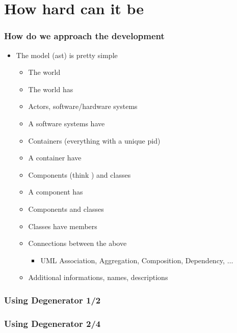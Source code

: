 \documentclass[xelatex,10pt]{beamer}
\begin{document}
\section{How hard can it be}
\begin{frame}
	\frametitle{How do we approach the development}
	\begin{itemize}
		\item The model (ast) is pretty simple
			\pause
		\begin{itemize}
			\item The world
			\item The world has
			\item Actors, software/hardware systems
			\item A software systems have
			\item Containers (everything with a unique pid)
			\item A container have
			\item Components (think \lstinline@module@) and classes
			\item A component has
			\item Components and classes
			\item Classes have members
				\pause
			\item Connections between the above
			\begin{itemize}
				\item UML Association, Aggregation, Composition, Dependency, \(\dots\)
			\end{itemize}
			\item Additional informations, names, descriptions
		\end{itemize}
	\end{itemize}
\end{frame}

\begin{frame}
	\frametitle{Using Degenerator 1/2}
	
\end{frame}
\begin{frame}
	\frametitle{Using Degenerator 2/4}
	
	\vfill
	\pause
	
\end{frame}
\end{document}
